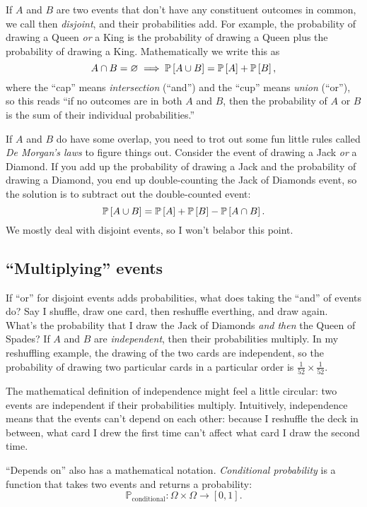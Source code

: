 If $A$ and $B$ are two events that don't have any constituent outcomes in
common, we call then \emph{disjoint}, and their probabilities add. For
example, the probability of drawing a Queen \emph{or} a King is the
probability of drawing a Queen plus the probability of drawing a King.
Mathematically we write this as
$$
A \cap B = \varnothing \implies \mathbb{P}\left[{A \cup B}\right] = \mathbb{P}\left[{A}\right] + \mathbb{P}\left[{B}\right],
$$
where the ``cap'' means \emph{intersection} (``and'') and the ``cup'' means
\emph{union} (``or''), so this reads ``if no outcomes are in both $A$ and $B$,
then the probability of $A$ or $B$ is the sum of their individual probabilities.''

If $A$ and $B$ do have some overlap, you need to trot out some fun little
rules called \emph{De Morgan's laws} to figure things out. Consider the event
of drawing a Jack \emph{or} a Diamond. If you add up the probability of
drawing a Jack and the probability of drawing a Diamond, you end up double-counting
the Jack of Diamonds event, so the solution is to subtract out the
double-counted event:
$$
\mathbb{P}\left[{A \cup B}\right] = \mathbb{P}\left[{A}\right] + \mathbb{P}\left[{B}\right] - \mathbb{P}\left[{A \cap B}\right].
$$
We mostly deal with disjoint events, so I won't belabor this point.

\subsection{``Multiplying'' events}

If ``or'' for disjoint events adds probabilities, what does taking the ``and''
of events do? Say I shuffle, draw one card, then reshuffle everthing, and draw
again. What's the probability that I draw the Jack of Diamonds \emph{and then}
the Queen of Spades? If $A$ and $B$ are \emph{independent}, then their
probabilities multiply. In my reshuffling example, the drawing of the two
cards are independent, so the probability of drawing two particular cards in a
particular order is $\tfrac{1}{52} \times \tfrac{1}{52}$.

The mathematical definition of independence might feel a little circular: two
events are independent if their probabilities multiply. Intuitively,
independence means that the events can't depend on each other: because I
reshuffle the deck in between, what card I drew the first time can't affect
what card I draw the second time.

``Depends on'' also has a mathematical notation. \emph{Conditional
probability} is a function that takes two events and returns a probability:
$$
\mathbb{P}_\mathrm{conditional} : \Omega \times \Omega \to [0, 1].
$$

